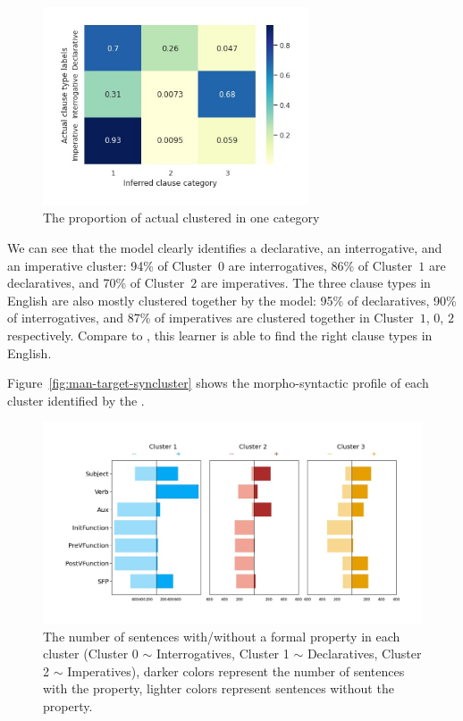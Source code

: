 \begin{figure}[H]
    \centering
    \includegraphics[width=0.7\textwidth]{figures/man-target-conservative-heatrev.jpg}
    \caption{The proportion of actual \diis{} clustered in one category}
    \label{fig:man-target-conservative-heatrev}
\end{figure}


We can see that the \plearnerabbr{} model clearly identifies a declarative, an interrogative, and an imperative cluster: 94\% of Cluster~$0$ are interrogatives, 86\% of Cluster~$1$ are declaratives, and 70\% of Cluster~$2$ are imperatives. The three clause types in English are also mostly clustered together by the model: 95\% of declaratives, 90\% of interrogatives, and 87\% of imperatives are clustered together in Cluster~$1$, $0$, $2$ respectively. Compare to \dlearnerabbr{}, this learner is able to find the right clause types in English.


Figure~\ref{fig:man-target-syncluster} shows the morpho-syntactic profile of each cluster identified by the \plearnerabbr{}. 

\begin{figure}[H]
    \centering
    \includegraphics[width=1\textwidth]{figures/man-target-conservative-syncluster.jpg}
    \caption{The number of sentences with/without a formal property in each cluster (Cluster 0 $\sim$ Interrogatives, Cluster 1 $\sim$ Declaratives, Cluster 2 $\sim$ Imperatives), darker colors represent the number of sentences with the property, lighter colors represent sentences without the property.}
    \label{fig:man-target-conservative-syncluster}
\end{figure}

